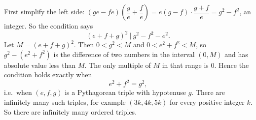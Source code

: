 First simplify the left side: $(ge-fe)\left(\dfrac {g}{e}+\dfrac {f}{e}\right)=e(g-f)\cdot\dfrac{g+f}{e}=g^2-f^2$, an integer. So the condition says
\[
(e+f+g)^2\ \Big|\ g^2-f^2-e^2 .
\]
Let $M=(e+f+g)^2$. Then $0<g^2<M$ and $0<e^2+f^2<M$, so $g^2-(e^2+f^2)$ is the difference of two numbers in the interval $(0,M)$ and has absolute value less than $M$. The only multiple of $M$ in that range is $0$. Hence the condition holds exactly when
\[
e^2+f^2=g^2 ,
\]
i.e.\ when $(e,f,g)$ is a Pythagorean triple with hypotenuse $g$. There are infinitely many such triples, for example $(3k,4k,5k)$ for every positive integer $k$. So there are $\boxed{\text{infinitely many}}$ ordered triples.

